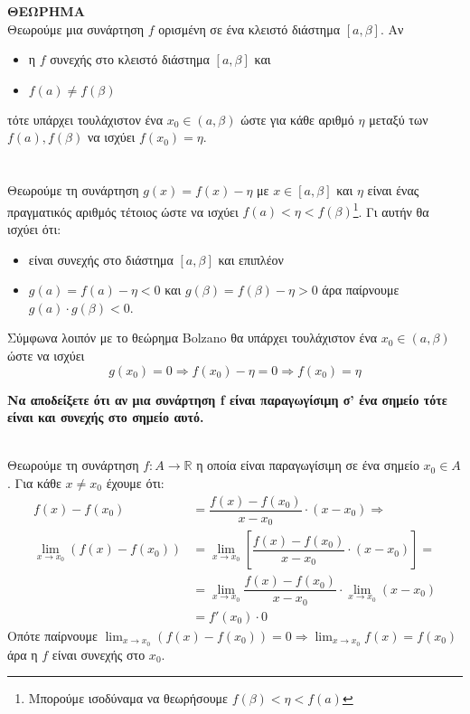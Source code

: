 \documentclass[a4paper,11pt,twoside]{article}
\def\xrwma{red!80!black}
\newcounter{Thewrhmabox}[section]
\renewcommand{\theThewrhmabox}{\arabic{Thewrhmabox}}
\newenvironment{Thewrhmabox}[2][\linewidth]
{\refstepcounter{Thewrhmabox}
\begin{tcolorbox}[breakable,
enhanced standard,
boxrule=0.7pt,titlerule=-.2pt,
width=\linewidth,
title style={color=white},
overlay unbroken and first={
\path[left color=\xrwma,right color=white,draw=black]
([yshift=-\pgflinewidth]frame.north west) to ([yshift=-5pt]title.south west)[rounded corners=2pt] -- ([xshift=-#2-15pt,yshift=-5pt]title.south east) to[rounded corners=2pt] ([xshift=-#2,yshift=-\pgflinewidth]frame.north east) -- cycle;
},
fonttitle=\bfseries,
before=\par\medskip\noindent,
after=\par\medskip,
toptitle=3pt,
top=11pt,topsep at break=-5pt,
colback=white,title={\kerkissans{\faStop\ \ \large Θεώρημα \theThewrhmabox}} : {\textcolor{black}{\kerkissans{#1}}}]}
{\end{tcolorbox}}
\begin{document}
\textbf{ΘΕΩΡΗΜΑ}\\
Θεωρούμε μια συνάρτηση $f$ ορισμένη σε ένα κλειστό διάστημα $[a,\beta]$. Αν
\begin{itemize}
\item η $f$ συνεχής στο κλειστό διάστημα $[a,\beta]$ και 
\item $f(a)\neq f(\beta)$
\end{itemize}
τότε υπάρχει τουλάχιστον ένα $ x_0\in(a,\beta) $ ώστε για κάθε αριθμό $ \eta $ μεταξύ των $ f(a),f(\beta) $ να ισχύει $ f(x_0)=\eta $.\\\\
\textbf{}\\
Θεωρούμε τη συνάρτηση $ g(x)=f(x)-\eta $ με $ x\in[a,\beta] $ και $ \eta $ είναι ένας πραγματικός αριθμός τέτοιος ώστε να ισχύει $ f(a)<\eta<f(\beta) $\footnote{Μπορούμε ισοδύναμα να θεωρήσουμε $ f(\beta)<\eta<f(a) $}. Γι αυτήν θα ισχύει ότι:
\begin{itemize}
\item είναι συνεχής στο διάστημα $ [a,\beta] $ και επιπλέον
\item $ g(a)=f(a)-\eta<0 $ και $ g(\beta)=f(\beta)-\eta>0 $ άρα παίρνουμε $ g(a)\cdot g(\beta)<0 $.
\end{itemize}
Σύμφωνα λοιπόν με το θεώρημα Bolzano θα υπάρχει τουλάχιστον ένα $ x_0\in(a,\beta) $ ώστε να ισχύει \[ g(x_0)=0\Rightarrow f(x_0)-\eta=0\Rightarrow f(x_0)=\eta \]
\begin{Thewrhmabox}[Παραγωγίσιμη \bmath{$ \Rightarrow $} Συνεχής - Σελ. 217]{7cm}
\textbf{Να αποδείξετε ότι αν μια συνάρτηση f είναι παραγωγίσιμη σ’ ένα σημείο  τότε είναι και συνεχής στο σημείο αυτό. }
\end{Thewrhmabox}
\textbf{}\\
Θεωρούμε τη συνάρτηση $ f:A\to\mathbb{R} $ η οποία είναι παραγωγίσιμη σε ένα σημείο $ x_0\in A $. Για κάθε $ x\neq x_0 $ έχουμε ότι:
\begin{align*}
f(x)-f(x_0)&=\dfrac{f(x)-f(x_0)}{x-x_0}\cdot (x-x_0)\Rightarrow\\
\lim_{x\to x_0}{\left( f(x)-f(x_0)\right) }&=\lim_{x\to x_0}{\left[
\dfrac{f(x)-f(x_0)}{x-x_0}\cdot (x-x_0)\right]}=\\
&=\lim_{x\to x_0}{
\dfrac{f(x)-f(x_0)}{x-x_0}}\cdot \lim_{x\to x_0}{(x-x_0)}\\
&=f'(x_0)\cdot 0
\end{align*}
Οπότε παίρνουμε $ {\displaystyle \lim_{x\to x_0}{\left( f(x)-f(x_0)\right) }=0\Rightarrow \lim_{x\to x_0}{f(x)}=f(x_0)} $ άρα η $ f $ είναι συνεχής στο $ x_0 $.
\end{document}
